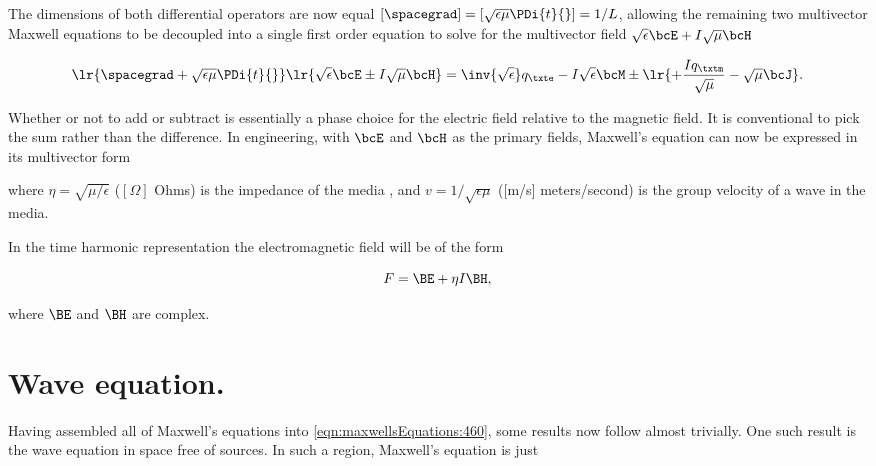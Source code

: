 The dimensions of both differential operators are now equal \( [\spacegrad] = [\sqrt{\epsilon\mu} \PDi{t}{}] = 1/L \), allowing the remaining two multivector Maxwell equations to be decoupled into a single first order equation to solve for the multivector field \( \sqrt{\epsilon} \bcE + I \sqrt{\mu} \bcH \)

\begin{dmath}\label{eqn:maxwellsEquations:440}
\lr{ \spacegrad + \sqrt{\epsilon\mu} \PDi{t}{} }
\lr{ \sqrt{\epsilon} \bcE
\pm
I \sqrt{\mu} \bcH
}
=
\inv{\sqrt{\epsilon}} q_\txte
- I \sqrt{\epsilon} \bcM
\pm \lr{
+ \frac{I q_\txtm}{\sqrt{\mu}}
- \sqrt{\mu} \bcJ
}
.
\end{dmath}

Whether or not to add or subtract is essentially a phase choice for the electric field relative to the magnetic field.  It is conventional to pick the sum rather than the difference.  In engineering, with \( \bcE \) and \( \bcH \) as the primary fields, Maxwell's equation can now be expressed in its multivector form


where \( \eta = \sqrt{\mu/\epsilon} \) (\( [\Omega] \) Ohms)
is the impedance of the media
, and \( v = 1/\sqrt{\epsilon\mu} \)
([\si{m/s}] meters/second)
is the group velocity of a wave in the media.

In the time harmonic representation the electromagnetic field will be of the form

\begin{dmath}\label{eqn:maxwellsEquations:620}
F = \BE + \eta I \BH,
\end{dmath}

where \( \BE \) and \( \BH \) are complex.

\makedigression{

}

\section{Wave equation.}

Having assembled all of Maxwell's equations into \cref{eqn:maxwellsEquations:460}, some results now follow almost trivially.  One such result is the wave equation in space free of sources.  In such a region, Maxwell's equation is just

